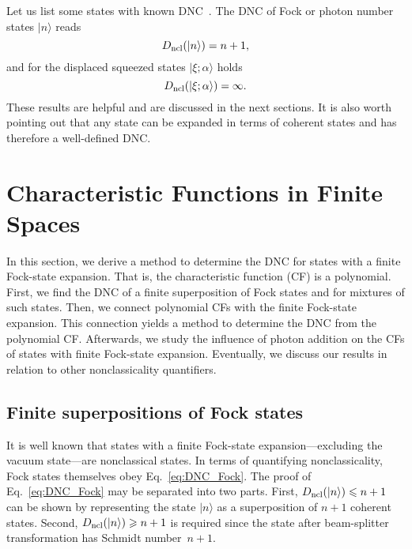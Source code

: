 \documentclass[aps,pra,twocolumn,showpacs,superscriptaddress,10pt]{revtex4-1}
\begin{document}
	Let us list some states with known DNC~\cite{Vogel2014}.
	The DNC of Fock or photon number states $|n\rangle$ reads
	\begin{equation}
		D_{\rm ncl}(|n\rangle)= n+1, \label{eq:DNC_Fock}
	\end{equation}
	and for the displaced squeezed states $|\xi;\alpha\rangle$ holds
	\begin{equation}
		D_{\rm ncl}(|\xi;\alpha\rangle)=\infty. \label{eq:DNC_sq}
	\end{equation}
	These results are helpful and are discussed in the next sections.
	It is also worth pointing out that any state can be expanded in terms of coherent states and has therefore a well-defined DNC.

\section{Characteristic Functions in Finite Spaces}\label{sec:finSpaces}
	In this section, we derive a method to determine the DNC for states with a finite Fock-state expansion.
	That is, the characteristic function (CF) is a polynomial.
	First, we find the DNC of a finite superposition of Fock states and for mixtures of such states.
	Then, we connect polynomial CFs with the finite Fock-state expansion.
	This connection yields a method to determine the DNC from the polynomial CF.
	Afterwards, we study the influence of photon addition on the CFs of states with finite Fock-state expansion.
	Eventually, we discuss our results in relation to other nonclassicality quantifiers.

\subsection{Finite superpositions of Fock states}
	It is well known that states with a finite Fock-state expansion---excluding the vacuum state---are nonclassical states.
	In terms of quantifying nonclassicality, Fock states themselves obey Eq.~\eqref{eq:DNC_Fock}.
	The proof of Eq.~\eqref{eq:DNC_Fock} may be separated into two parts.
	First, $D_{\rm ncl}(|n\rangle)\leqslant n+1$ can be shown by representing the state $|n\rangle$ as a superposition of $n+1$ coherent states.
	Second, $D_{\rm ncl}(|n\rangle)\geqslant n+1$ is required since the state after beam-splitter transformation has Schmidt number~$n+1$.
\end{document}

